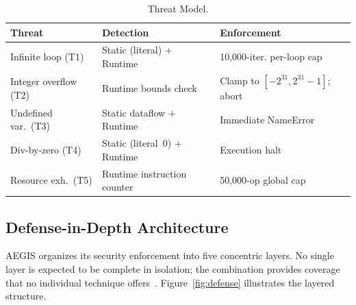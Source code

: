 \documentclass[conference]{IEEEtran}
\begin{document}
\begin{table}[t]
\caption{Threat Model.}
\label{tab:threats}
\centering
\renewcommand{\arraystretch}{1.18}
\small
\begin{tabular}{@{} p{1.55cm} p{2.0cm} p{2.55cm} @{}}
\toprule
\textbf{Threat} & \textbf{Detection} & \textbf{Enforcement} \\
\midrule
Infinite loop (T1)     & Static (literal) $+$ Runtime & 10,000-iter.
                         per-loop cap \\[2pt]
Integer overflow (T2)  & Runtime bounds check  & Clamp to $[-2^{31},
                         2^{31}-1]$; abort \\[2pt]
Undefined var.\ (T3)   & Static dataflow $+$ Runtime & Immediate
                         NameError \\[2pt]
Div-by-zero (T4)       & Static (literal~0) $+$ Runtime & Execution
                         halt \\[2pt]
Resource exh.\ (T5)    & Runtime instruction counter & 50,000-op
                         global cap \\
\bottomrule
\end{tabular}
\end{table}

\subsection{Defense-in-Depth Architecture}

AEGIS organizes its security enforcement into five concentric layers.
No single layer is expected to be complete in isolation; the
combination provides coverage that no individual technique
offers~\cite{khoury2022buffer}. Figure~\ref{fig:defense} illustrates
the layered structure.
\end{document}
